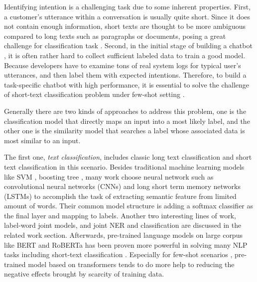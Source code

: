\documentclass[letterpaper]{article} %
\begin{document}
  Identifying intention  is  a  challenging task due to some inherent properties. First,
  a customer's  utterance  within  a conversation is usually quite short. Since it
  does  not  contain  enough  information,  short  texts \cite{song2014short} are
  thought  to  be  more  ambiguous  compared to long texts such as paragraphs or
  documents,  posing  a  great challenge \cite{chen2019deep} for classification
  task   \cite{phan2008learning,yan2009dynamic,hua2015short}.   Second,  in  the
  initial  stage  of  building  a  chatbot  , it is often rather hard to collect
  sufficient  labeled  data  to  train  a good model. Because developers have to
  examine tons of real system logs for typical user's utterances, and then label
  them  with expected intentions. Therefore, to build a task-specific chatbot with
  high  performance, it is essential to solve the challenge of short-text
  classification   \cite{sriram2010short}   problem   under   few-shot   setting
  \cite{yu2018diverse}.


  Generally  there  are  two  kinds  of  approaches  to  address  this  problem,
  one is the classification model that directly maps an input into a most likely label, and
  the other one is the similarity  model  that searches a label whose associated data is most similar to
  an input.


  The   first  one,  \emph{text  classification},  includes  classic  long  text
  classification  and  short  text  classification  in  this  scenario.  Besides
  traditional  machine  learning  models  like  SVM \cite{suykens1999least},  
  boosting  tree \cite{tu2005probabilistic},  many work
  \cite{wen2016network}  choose  neural  network  such  as  convolutional neural
  networks (CNNs) \cite{kim2014convolutional,zhang2015character,conneau2016very}
  and       long       short       term       memory       networks      (LSTMs)
  \cite{mousa2017contextual,liu2016recurrent}   to   accomplish   the   task  of
  extracting  semantic  feature from limited amount of words. Their common model
  structure  is  adding  a  softmax classifier as the final layer and mapping to
  labels.  Another  two  interesting lines of work, label-word joint models, and
  joint  NER  and  classification  are  discussed  in  the related work section.
  Afterwards,   pre-trained   language   models   on   large  corpus  like  BERT
  \cite{devlin2018bert}  and  RoBERTa \cite{liu2019roberta} has been proven more
  powerful  in  solving  many  NLP  tasks  including  short-text  classification
  \cite{madabushi2020cost}.      Especially      for      few-shot     scenarios
  \cite{yu2018diverse},     pre-trained     model    based    on    transformers
  \cite{vaswani2017attention} tends to do more
  help to reducing the negative effects brought by scarcity of training data.
\end{document}
